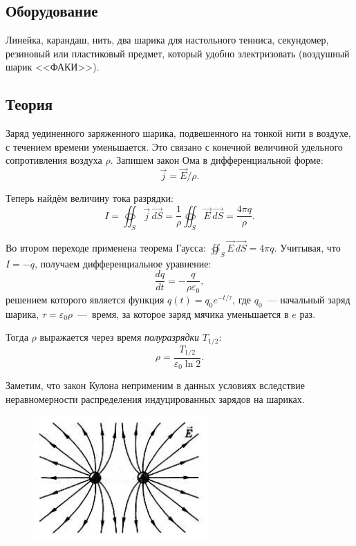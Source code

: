 \documentclass[a4paper, 12pt]{article}
\begin{document}
\subsection*{Оборудование}
Линейка, карандаш, нить, два шарика для настольного тенниса, секундомер, резиновый или пластиковый предмет, который удобно электризовать (воздушный шарик <<ФАКИ>>).


\subsection*{Теория}
Заряд уединенного заряженного шарика, подвешенного на тонкой нити в воздухе, с течением времени уменьшается. Это связано с конечной величиной удельного сопротивления воздуха $\rho$. Запишем закон Ома в дифференциальной форме:
\begin{equation}
\vec{j} = \vec{E}/\rho.
\end{equation}

Теперь найдём величину тока разрядки:
\begin{equation}
I = \oiint_S \vec{j} \,\vec{dS} = \frac{1}{\rho}\oiint_S \vec{E} \,\vec{dS} = \dfrac{4 \pi q}{\rho}.
\end{equation}

Во втором переходе применена теорема Гаусса: $\oiint_S \vec{E} \,\vec{dS} = 4 \pi q$. Учитывая, что $I = -\dot q$, получаем дифференциальное уравнение:
\begin{equation}
\frac{dq}{dt} = - \frac{q}{\rho \varepsilon_0},
\end{equation}
решением которого является функция $q(t) = q_0  e^{-t/\tau}$, где $q_0$~---
начальный заряд шарика, $\tau = \varepsilon_0 \rho$~---~время, за которое заряд мячика уменьшается в $e$ раз. 

Тогда $\rho$ выражается через время \emph{полуразрядки} $T_{1/2}$:
\begin{equation}
\rho = \frac{T_{1/2}}{\varepsilon_0 \ln 2}.
\end{equation}

Заметим, что закон Кулона неприменим в данных условиях вследствие неравномерности распределения индуцированных зарядов на шариках.

\begin{figure}[H]
\begin{center}
\includegraphics[width=0.6\textwidth]{7}
\end{center}
\end{figure}
\end{document}
